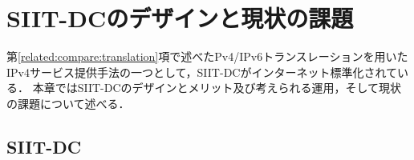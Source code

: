 \chapter{SIIT-DCのデザインと現状の課題}
\label{issue}
第\ref{related:compare:translation}項で述べたPv4/IPv6トランスレーションを用いたIPv4サービス提供手法の一つとして，SIIT-DCがインターネット標準化されている．
本章ではSIIT-DCのデザインとメリット及び考えられる運用，そして現状の課題について述べる．
\section{SIIT-DC}
\label{issue:siit-dc}







